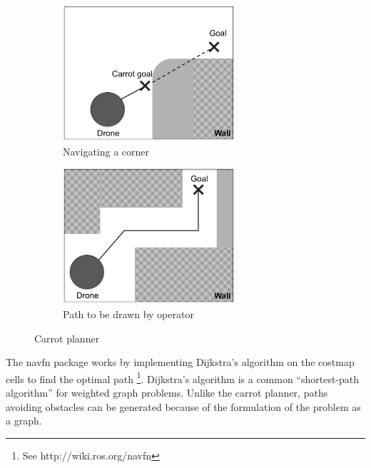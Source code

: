 \documentclass[capstone_report.tex]{subfiles}
\begin{document}
\begin{figure}[H]
    \centering
    \begin{subfigure}{.5\textwidth}
        \centering
        \includegraphics[width=0.7\textwidth]{imgs/carrot_planner_a.png}
        \caption{Navigating a corner}
    \end{subfigure}%
    \begin{subfigure}{.5\textwidth}
        \centering
        \includegraphics[width=0.7\textwidth]{imgs/carrot_planner_b.png}
        \caption{Path to be drawn by operator}
    \end{subfigure}
    \caption{Carrot planner\label{fig:carrot}}
\end{figure}

The navfn package works by implementing Dijkstra’s algorithm on the costmap cells to find the optimal path \footnote{See http://wiki.ros.org/navfn}.  Dijkstra’s algorithm is a common “shortest-path algorithm” for weighted graph problems.   Unlike the carrot planner, paths avoiding obstacles can be generated because of the formulation of the problem as a graph.\\
\end{document}
